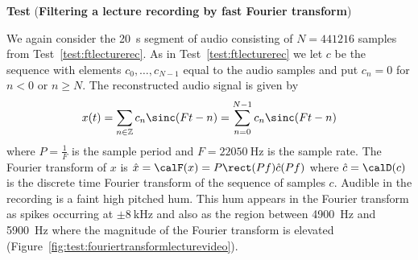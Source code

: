 \documentclass[11pt,a4paper]{book}
\theoremstyle{plain}
\numberwithin{equation}{section}
\newcommand{\ints}{{\mathbb Z}}
\newcounter{test}
\newenvironment{test}{
\begin{shaded}\refstepcounter{test}\par\noindent%
\textbf{Test \thetest}
}{
\end{shaded}
}
\begin{document}
\begin{test}\label{test:fftlecturerec}
(\textbf{Filtering a lecture recording by fast Fourier transform})
 
We again consider the \SI{20}{\second} segment of audio consisting of $N=441216$ samples from Test~\ref{test:ftlecturerec}.  As in Test~\ref{test:ftlecturerec} we let $c$ be the sequence with elements $c_0,\dots,c_{N-1}$ equal to the audio samples and put $c_n = 0$ for $n < 0$ or $n \geq N$.  The reconstructed audio signal is given by
\[
x(t) = \sum_{n \in \ints} c_n \sinc(Ft - n) = \sum_{n=0}^{N-1} c_n \sinc(Ft - n)
\] 
where $P = \tfrac{1}{F}$ is the sample period and $F = \SI{22050}{\hertz}$ is the sample rate.  The Fourier transform of $x$ is $\hat{x} = \calF(x) = P\rect(Pf)\hat{c}(Pf)$ where $\hat{c} = \calD(c)$ is the discrete time Fourier transform of the sequence of samples $c$.  Audible in the recording is a faint high pitched hum.  This hum appears in the Fourier transform as spikes occurring at $\pm\SI{8}{\kilo\hertz}$ and also as the region between \SI{4900}{\hertz} and \SI{5900}{\hertz} where the magnitude of the Fourier transform is elevated (Figure~\ref{fig:test:fouriertransformlecturevideo}).  


\end{test}
\end{document}
